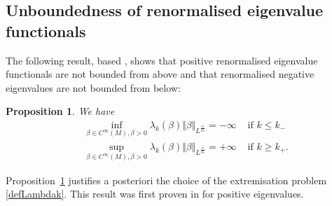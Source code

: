 \documentclass[10pt]{amsart}
\numberwithin{equation}{section}
\def\be{{\beta}}
\theoremstyle{plain}
\newtheorem{prop}[theo]{Proposition}%
\theoremstyle{remark}
\begin{document}
\subsection{Unboundedness of renormalised eigenvalue functionals}
The following result, based \cite{AmmannJammes}, shows that positive renormalised eigenvalue functionals are not bounded from above and that renormalised negative eigenvalues are not bounded from below:

\begin{prop} \label{prop:unbounded}
We have
\begin{equation} \label{eq:unbounded}
\begin{aligned}
& \inf_{\be \in C^\infty(M), \be>0}  \lambda_k(\beta) \Vert \beta \Vert_{L^{\frac{n}{2s}}}  = -\infty & \text{ if } k \le k_{-} \\
& \sup_{\be \in C^\infty(M), \be>0}  \lambda_k(\beta) \Vert \beta \Vert_{L^{\frac{n}{2s}}} = +\infty & \text{ if } k \ge k_{+}. 
\end{aligned}
\end{equation}
\end{prop} 
Proposition~\ref{prop:unbounded} justifies a posteriori the choice of the extremisation problem \eqref{defLambdak}. This result was first proven in \cite{AmmannJammes} for positive eigenvalues. 
\end{document}
